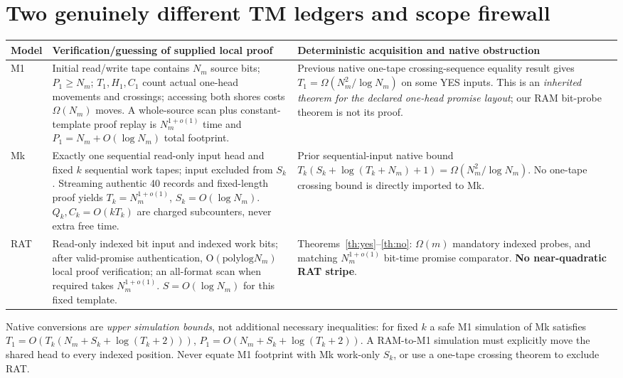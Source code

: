 \documentclass[11pt]{article}
\begin{document}
\section{Two genuinely different TM ledgers and scope firewall}
\begin{center}
\begin{tabular}{p{.13\linewidth}p{.40\linewidth}p{.38\linewidth}}
\toprule
Model & Verification/guessing of supplied local proof & Deterministic acquisition and native obstruction\\
\midrule
M1 & Initial read/write tape contains $N_m$ source bits;
$P_1\ge N_m$; $T_1,H_1,C_1$ count actual one-head movements and crossings;
accessing both shores costs $\Omega(N_m)$ moves.
A whole-source scan plus constant-template proof replay is
$N_m^{1+o(1)}$ time and $P_1=N_m+O(\log N_m)$ total footprint.
& Previous native one-tape crossing-sequence equality result gives
$T_1=\Omega(N_m^2/\log N_m)$ on some YES inputs. This is an
\emph{inherited theorem for the declared one-head promise layout};
our RAM bit-probe theorem is not its proof.\\[2mm]
Mk & Exactly one sequential read-only input head and fixed $k$
sequential work tapes; input excluded from $S_k$.
Streaming authentic 40 records and fixed-length proof yields
$T_k=N_m^{1+o(1)}$, $S_k=O(\log N_m)$.
$Q_k,C_k=O(kT_k)$ are charged subcounters, never extra free time.
& Prior sequential-input native bound
$T_k(S_k+\log(T_k+N_m)+1)=\Omega(N_m^2/\log N_m)$.
No one-tape crossing bound is directly imported to Mk.\\[2mm]
RAT & Read-only indexed bit input and indexed work bits;
after valid-promise authentication, O$(\mathrm{polylog}N_m)$
local proof verification; an all-format scan when required takes
$N_m^{1+o(1)}$. $S=O(\log N_m)$ for this fixed template.
& Theorems~\ref{th:yes}--\ref{th:no}: $\Omega(m)$
mandatory indexed probes, and matching $N_m^{1+o(1)}$
bit-time promise comparator. \textbf{No near-quadratic RAT stripe}.\\
\bottomrule
\end{tabular}
\end{center}
Native conversions are \emph{upper simulation bounds}, not
additional necessary inequalities:
for fixed $k$ a safe M1 simulation of Mk satisfies
$T_1=O(T_k(N_m+S_k+\log(T_k+2)))$,
$P_1=O(N_m+S_k+\log(T_k+2))$.
A RAM-to-M1 simulation must explicitly move the shared head to
every indexed position. Never equate M1 footprint with Mk
work-only $S_k$, or use a one-tape crossing theorem to exclude RAT.
\end{document}
